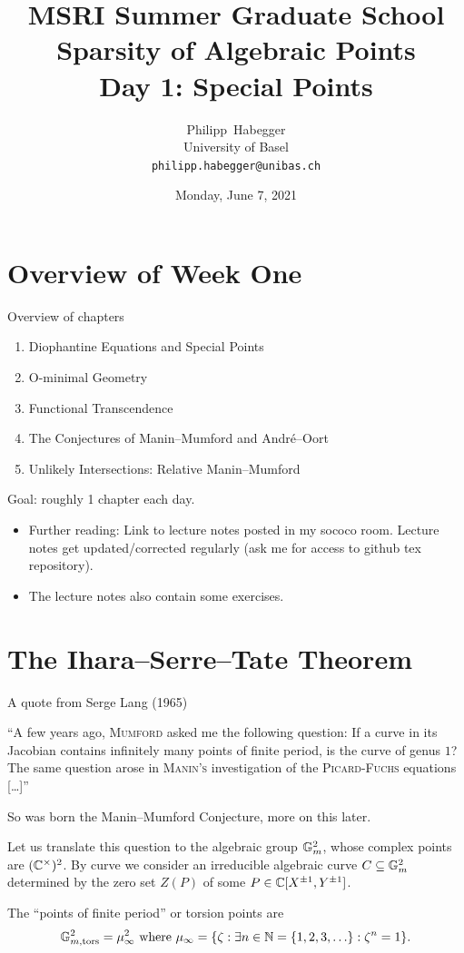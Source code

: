 \documentclass{beamer}
\title{MSRI Summer Graduate School \\ Sparsity of Algebraic Points \\
  Day 1: Special Points}
\author{Philipp~Habegger \\ University of Basel \\ \texttt{philipp.habegger@unibas.ch}}
\date{Monday, June 7, 2021}
\begin{document}
\setlength{\abovecaptionskip}{0pt} 
\setlength{\belowcaptionskip}{0pt} 

\renewcommand{\figurename}{Fig.}


\begin{frame}
  \titlepage
\end{frame}

\section{Overview of Week One}

\begin{frame}{Overview of chapters}
  \begin{enumerate}
  \item Diophantine Equations and Special Points
  \item O-minimal Geometry
  \item Functional Transcendence
  \item The Conjectures of Manin--Mumford and Andr\'e--Oort
  \item Unlikely Intersections: Relative Manin--Mumford
  \end{enumerate}

  Goal: roughly 1 chapter each day.

  \begin{itemize}
  \item   Further reading: Link to \alert{lecture notes} posted in my sococo
    room. Lecture notes get updated/corrected regularly
    (ask me for access to github tex repository).
  \item The lecture notes also contain some exercises.
  \end{itemize}
\end{frame}

\section{The Ihara--Serre--Tate Theorem}

\begin{frame}{A quote from Serge Lang (1965)}
  \bigskip
  
  \begin{displayquote}
    ``A few years ago, \textsc{Mumford} asked me the following question:
    If a curve in its Jacobian contains infinitely many points of finite
    period, is the curve of genus $1$? The same question arose in
    \textsc{Manin's} investigation of the \textsc{Picard-Fuchs}
    equations [\ldots]''
  \end{displayquote}

  So was born the Manin--Mumford Conjecture, more on this later.

  Let us translate this question
  to the \alert{algebraic group} ${\mathbb{G}}_m^2$, whose complex points are
  $({\mathbb{C}}^\times)^2$. By
  curve we consider an irreducible algebraic curve $C\subseteq
  {\mathbb{G}}_m^2$ determined  by the zero set $Z(P)$ of
  some $P\in {\mathbb{C}}[X^{\pm 1},Y^{\pm 1}]$.

  The ``points of finite period'' or  torsion points are
  $$ {\mathbb{G}}_{m,\mathrm{tors}}^2= \mu_\infty^2  \text{ where
  }\mu_\infty = \{\zeta :\exists n\in{\mathbb{N}}=\{1,2,3,\ldots\}: \zeta^n=1 \}.$$
\end{frame}
\end{document}
